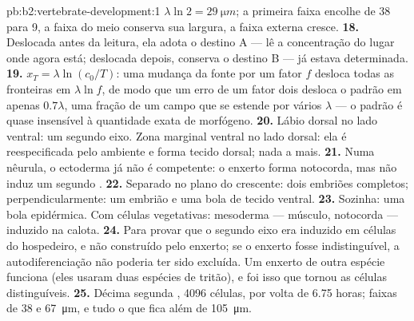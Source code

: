 \begin{solution}{pb:b2:vertebrate-development:1}
$\lambda\ln 2 =
\qty{29}{\micro m}$; a primeira faixa encolhe de 38 para 9, a faixa do
meio conserva sua largura, a faixa externa cresce.
\textbf{18.} Deslocada antes da leitura, ela adota o destino A --- lê
a concentração do lugar onde agora está; deslocada depois, conserva o
destino B --- já estava determinada.
\textbf{19.} $x_T = \lambda\ln(c_0/T)$: uma mudança da fonte por um
fator $f$ desloca todas as fronteiras em $\lambda\ln f$, de modo que um
erro de um fator dois desloca o padrão em apenas $0.7\lambda$, uma
fração de um campo que se estende por vários $\lambda$ --- o padrão é
quase insensível à quantidade exata de morfógeno.
\textbf{20.} Lábio dorsal no lado ventral: um segundo eixo. Zona
marginal ventral no lado dorsal: ela é reespecificada pelo ambiente e
forma tecido dorsal; nada a mais.
\textbf{21.} Numa nêurula, o ectoderma já não é competente: o enxerto
forma notocorda, mas não induz um segundo .
\textbf{22.} Separado no plano do crescente: dois embriões completos;
perpendicularmente: um embrião e uma bola de tecido ventral.
\textbf{23.} Sozinha: uma bola epidérmica. Com células vegetativas:
mesoderma --- músculo, notocorda --- induzido na calota.
\textbf{24.} Para provar que o segundo eixo era induzido em células do
hospedeiro, e não construído pelo enxerto; se o enxerto fosse
indistinguível, a autodiferenciação não poderia ter sido excluída. Um
enxerto de outra espécie funciona (eles usaram duas espécies de
tritão), e foi isso que tornou as células distinguíveis.
\textbf{25.} Décima segunda , 4096 células, por volta de 6.75
horas; faixas de 38 e \qty{67}{\micro m}, e tudo o que fica além de
\qty{105}{\micro m}.
\end{solution}
